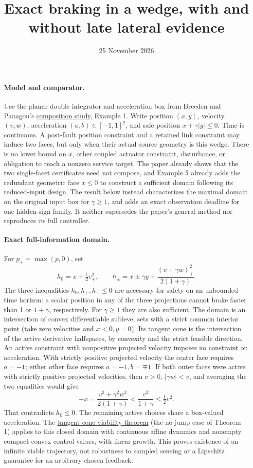 \documentclass[11pt]{article}
\title{Exact braking in a wedge, with and without late lateral evidence}
\date{25 November 2026}
\begin{document}
\maketitle
\paragraph{Model and comparator.}
Use the planar double integrator and acceleration box from Breeden and Panagou's
\href{https://public.websites.umich.edu/~dpanagou/assets/documents/JBreeden_ACC23.pdf}{composition study}, Example 1. Write position \((x,y)\), velocity \((v,w)\), acceleration \((a,b)\in[-1,1]^2\), and safe position \(x+\gamma |y|\leq0\). Time is continuous. A post-fault position constraint and a retained link constraint may induce two faces, but only when their actual source geometry is this wedge. There is no lower bound on \(x\), other coupled actuator constraint, disturbance, or obligation to reach a nonzero service target. The paper already shows that the two single-facet certificates need not compose, and Example 5 already adds the redundant geometric face \(x\leq0\) to construct a sufficient domain following its reduced-input design. The result below instead characterizes the maximal domain on the original input box for \(\gamma\geq 1\), and adds an exact observation deadline for one hidden-sign family. It neither supersedes the paper's general method nor reproduces its full controller.
\paragraph{Exact full-information domain.}
For \(p_+=\max(p,0)\), set
\[
 h_0=x+\tfrac12 v_+^2,\qquad
 h_\pm=x\pm\gamma y+\frac{(v\pm\gamma w)_+^2}{2(1+\gamma)}.
\]
The three inequalities \(h_0,h_+,h_-\leq0\) are necessary for safety on an unbounded time horizon: a scalar position in any of the three projections cannot brake faster than 1 or \(1+\gamma\), respectively. For \(\gamma\geq1\) they are also sufficient. The domain is an intersection of convex differentiable sublevel sets with a strict common interior point (take zero velocities and \(x<0,y=0\)). Its tangent cone is the intersection of the active derivative halfspaces, by convexity and the strict feasible direction. An active constraint with nonpositive projected velocity imposes no constraint on acceleration. With strictly positive projected velocity the center face requires \(a=-1\); either other face requires \(a=-1,b=\mp1\). If both outer faces were active with strictly positive projected velocities, then \(v>0\), \(|\gamma w|<v\), and averaging the two equalities would give
\[
 -x=\frac{v^2+\gamma^2w^2}{2(1+\gamma)}<\frac{v^2}{1+\gamma}\leq \tfrac12v^2 .
\]
That contradicts \(h_0\leq0\). The remaining active choices share a box-valued acceleration. The \href{https://people.eecs.berkeley.edu/~sastry/pubs/OldSastryALL/Aubin\%2CLygerosImpulseDifferential2002.pdf}{tangent-cone viability theorem} (the no-jump case of Theorem 1) applies to this closed domain with continuous affine dynamics and nonempty compact convex control values, with linear growth. This proves existence of an infinite viable trajectory, not robustness to sampled sensing or a Lipschitz guarantee for an arbitrary chosen feedback.
\end{document}
